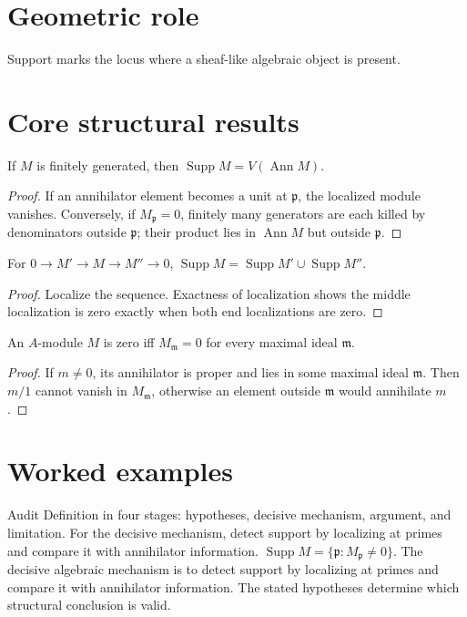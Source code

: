\section{Geometric role}
Support marks the locus where a sheaf-like algebraic object is present.

\section{Core structural results}

\begin{theorem}\label{thm:v16-01}
If $M$ is finitely generated, then $\operatorname{Supp}M=V(\operatorname{Ann}M)$.
\begin{proof}
If an annihilator element becomes a unit at $\mathfrak p$, the localized module vanishes. Conversely, if $M_{\mathfrak p}=0$, finitely many generators are each killed by denominators outside $\mathfrak p$; their product lies in $\operatorname{Ann}M$ but outside $\mathfrak p$.
\end{proof}
\end{theorem}

\begin{theorem}\label{thm:v16-02}
For $0\to M'\to M\to M''\to0$, $\operatorname{Supp}M=\operatorname{Supp}M'\cup\operatorname{Supp}M''$.
\begin{proof}
Localize the sequence. Exactness of localization shows the middle localization is zero exactly when both end localizations are zero.
\end{proof}
\end{theorem}

\begin{theorem}\label{thm:v16-03}
An $A$-module $M$ is zero iff $M_{\mathfrak m}=0$ for every maximal ideal $\mathfrak m$.
\begin{proof}
If $m\ne0$, its annihilator is proper and lies in some maximal ideal $\mathfrak m$. Then $m/1$ cannot vanish in $M_{\mathfrak m}$, otherwise an element outside $\mathfrak m$ would annihilate $m$.
\end{proof}
\end{theorem}

\section{Worked examples}

\begin{example}\label{ex:v16-worked-01}
Audit Definition in four stages: hypotheses, decisive mechanism, argument, and limitation. For the decisive mechanism, detect support by localizing at primes and compare it with annihilator information. $\operatorname{Supp}M=\{\mathfrak p:M_{\mathfrak p}\ne0\}$. The decisive algebraic mechanism is to detect support by localizing at primes and compare it with annihilator information. The stated hypotheses determine which structural conclusion is valid.
\end{example}


